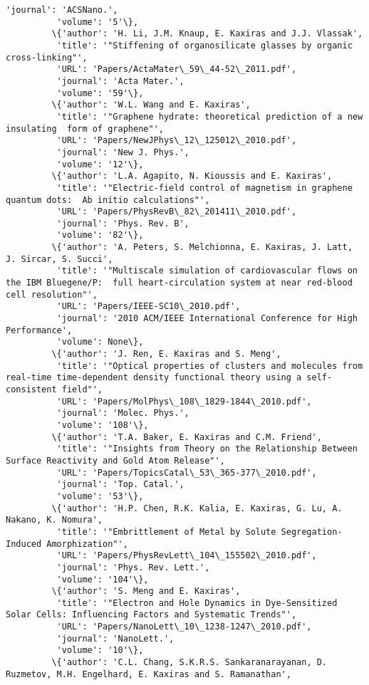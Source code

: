 \documentclass[11pt]{article}
\begin{document}
\begin{Verbatim}[commandchars=\\\{\}]
          'journal': 'ACSNano.',
          'volume': '5'\},
         \{'author': 'H. Li, J.M. Knaup, E. Kaxiras and J.J. Vlassak',
          'title': '"Stiffening of organosilicate glasses by organic cross-linking"',
          'URL': 'Papers/ActaMater\_59\_44-52\_2011.pdf',
          'journal': 'Acta Mater.',
          'volume': '59'\},
         \{'author': 'W.L. Wang and E. Kaxiras',
          'title': '"Graphene hydrate: theoretical prediction of a new insulating  form of graphene"',
          'URL': 'Papers/NewJPhys\_12\_125012\_2010.pdf',
          'journal': 'New J. Phys.',
          'volume': '12'\},
         \{'author': 'L.A. Agapito, N. Kioussis and E. Kaxiras',
          'title': '"Electric-field control of magnetism in graphene quantum dots:  Ab initio calculations"',
          'URL': 'Papers/PhysRevB\_82\_201411\_2010.pdf',
          'journal': 'Phys. Rev. B',
          'volume': '82'\},
         \{'author': 'A. Peters, S. Melchionna, E. Kaxiras, J. Latt, J. Sircar, S. Succi',
          'title': '"Multiscale simulation of cardiovascular flows on the IBM Bluegene/P:  full heart-circulation system at near red-blood cell resolution"',
          'URL': 'Papers/IEEE-SC10\_2010.pdf',
          'journal': '2010 ACM/IEEE International Conference for High Performance',
          'volume': None\},
         \{'author': 'J. Ren, E. Kaxiras and S. Meng',
          'title': '"Optical properties of clusters and molecules from real-time time-dependent density functional theory using a self-consistent field"',
          'URL': 'Papers/MolPhys\_108\_1829-1844\_2010.pdf',
          'journal': 'Molec. Phys.',
          'volume': '108'\},
         \{'author': 'T.A. Baker, E. Kaxiras and C.M. Friend',
          'title': '"Insights from Theory on the Relationship Between Surface Reactivity and Gold Atom Release"',
          'URL': 'Papers/TopicsCatal\_53\_365-377\_2010.pdf',
          'journal': 'Top. Catal.',
          'volume': '53'\},
         \{'author': 'H.P. Chen, R.K. Kalia, E. Kaxiras, G. Lu, A. Nakano, K. Nomura',
          'title': '"Embrittlement of Metal by Solute Segregation-Induced Amorphization"',
          'URL': 'Papers/PhysRevLett\_104\_155502\_2010.pdf',
          'journal': 'Phys. Rev. Lett.',
          'volume': '104'\},
         \{'author': 'S. Meng and E. Kaxiras',
          'title': '"Electron and Hole Dynamics in Dye-Sensitized Solar Cells: Influencing Factors and Systematic Trends"',
          'URL': 'Papers/NanoLett\_10\_1238-1247\_2010.pdf',
          'journal': 'NanoLett.',
          'volume': '10'\},
         \{'author': 'C.L. Chang, S.K.R.S. Sankaranarayanan, D. Ruzmetov, M.H. Engelhard, E. Kaxiras and S. Ramanathan',

\end{Verbatim}
\end{document}
